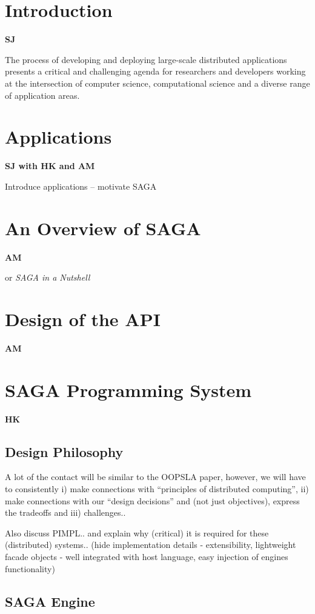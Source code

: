 \documentclass[10pt,letterpaper]{article}
\begin{document}
\section{Introduction} {\bf SJ}

The process of developing and deploying large-scale distributed
applications presents a critical and challenging agenda for
researchers and developers working at the intersection of computer
science, computational science and a diverse range of application
areas. 

\section{Applications}\label{application}{\bf SJ with HK and AM}

Introduce applications -- motivate SAGA

\section{An Overview of SAGA} {\bf AM}

or {\it SAGA in a Nutshell}

\section{Design of the API} {\bf AM}

\section{SAGA Programming System} {\bf HK}


\subsection{Design Philosophy}

A lot of the contact will be similar to the OOPSLA paper, however, we
will have to consistently i) make connections with ``principles of
distributed computing'', ii) make connections with our ``design
decisions'' and (not just objectives), express the tradeoffs and iii)
challenges..

Also discuss PIMPL..  and explain why (critical) it is required
for these (distributed) systems.. (hide implementation details - extensibility,
lightweight facade objects - well integrated with host language,
easy injection of engines functionality)

\subsection{SAGA Engine}
\end{document}
